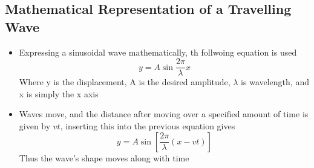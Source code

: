\subsection{Mathematical Representation of a Travelling Wave}
\begin{itemize}
    \item Expressing a sinusoidal wave mathematically, th follwoing equation is used \[y=A\sin\frac{2\pi}{\lambda}x\] Where y is the displacement, A is the desired amplitude, \(\lambda\) is wavelength, and x is simply the x axis
    \item Waves move, and the distance after moving over a specified amount of time is given by \(vt\), inserting this into the previous equation gives \[y=A\sin[\frac{2\pi}{\lambda}(x-vt)]\] Thus the wave's shape moves along with time
\end{itemize}

\newpage